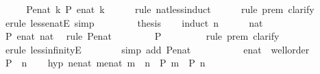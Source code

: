 \begin{isabellebody}
%
\isadelimproof
%
\endisadelimproof
%
\isatagproof
{}\isamarkupfalse%
\ {\isacharminus}\isanewline
\ \ \isamarkupfalse%
\ P{\isacharunderscore}enat{\isacharcolon}\ {\isachardoublequoteopen}{\isasymAnd}k{\isachardot}\ P\ {\isacharparenleft}enat\ k{\isacharparenright}{\isachardoublequoteclose}\isanewline
\ \ \ \ \isamarkupfalse%
\ {\isacharparenleft}rule\ nat{\isacharunderscore}less{\isacharunderscore}induct{\isacharparenright}\isanewline
\ \ \ \ \isamarkupfalse%
\ {\isacharparenleft}rule\ prem{\isacharcomma}\ clarify{\isacharparenright}\isanewline
\ \ \ \ \isamarkupfalse%
\ {\isacharparenleft}erule\ less{\isacharunderscore}enatE{\isacharcomma}\ simp{\isacharparenright}\isanewline
\ \ \ \ \isamarkupfalse%
\isanewline
\ \ \isamarkupfalse%
\ {\isacharquery}thesis\isanewline
\ \ \isamarkupfalse%
\ {\isacharparenleft}induct\ n{\isacharparenright}\isanewline
\ \ \ \ \isamarkupfalse%
\ nat\isanewline
\ \ \ \ \isamarkupfalse%
\ {\isachardoublequoteopen}P\ {\isacharparenleft}enat\ nat{\isacharparenright}{\isachardoublequoteclose}\ \isamarkupfalse%
\ {\isacharparenleft}rule\ P{\isacharunderscore}enat{\isacharparenright}\isanewline
\ \ \isamarkupfalse%
\isanewline
\ \ \ \ \isamarkupfalse%
\ {\isachardoublequoteopen}P\ {\isasyminfinity}{\isachardoublequoteclose}\isanewline
\ \ \ \ \ \ \isamarkupfalse%
\ {\isacharparenleft}rule\ prem{\isacharcomma}\ clarify{\isacharparenright}\isanewline
\ \ \ \ \ \ \isamarkupfalse%
\ {\isacharparenleft}erule\ less{\isacharunderscore}infinityE{\isacharparenright}\isanewline
\ \ \ \ \ \ \isamarkupfalse%
\ {\isacharparenleft}simp\ add{\isacharcolon}\ P{\isacharunderscore}enat{\isacharparenright}\isanewline
\ \ \ \ \ \ \isamarkupfalse%
\isanewline
\ \ \isamarkupfalse%
\isanewline
{}\isamarkupfalse%
%
\endisatagproof
{\isafoldproof}%
%
\isadelimproof
\isanewline
%
\endisadelimproof
\isanewline
{}\isamarkupfalse%
\ enat\ {\isacharcolon}{\isacharcolon}\ wellorder\isanewline
%
\isadelimproof
%
\endisadelimproof
%
\isatagproof
{}\isamarkupfalse%
\isanewline
\ \ \isamarkupfalse%
\ P\ \ n\isanewline
\ \ \isamarkupfalse%
\ hyp{\isacharcolon}\ {\isachardoublequoteopen}{\isacharparenleft}{\isasymAnd}n{\isacharcolon}{\isacharcolon}enat{\isachardot}\ {\isacharparenleft}{\isasymAnd}m{\isacharcolon}{\isacharcolon}enat{\isachardot}\ m\ {\isacharless}\ n\ {\isasymLongrightarrow}\ P\ m{\isacharparenright}\ {\isasymLongrightarrow}\ P\ n{\isacharparenright}{\isachardoublequoteclose}\isanewline

\end{isabellebody}

